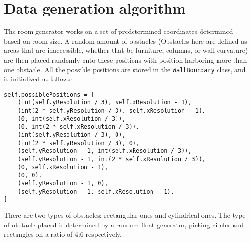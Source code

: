 \section{Data generation algorithm}

The room generator works on a set of predetermined coordinates determined based on room size. A random amount of obstacles (Obstacles here are defined as areas that are inaccessible, whether that be furniture, columns, or wall curvature) are then placed randomly onto these positions with position harboring more than one obstacle. All the possible positions are stored in the \texttt{WallBoundary} class, and is initialized as follows:
\begin{verbatim}
self.possiblePositions = [
    (int(self.yResolution / 3), self.xResolution - 1),
    (int(2 * self.yResolution / 3), self.xResolution - 1),
    (0, int(self.xResolution / 3)),
    (0, int(2 * self.xResolution / 3)),
    (int(self.yResolution / 3), 0),
    (int(2 * self.yResolution / 3), 0),
    (self.yResolution - 1, int(self.xResolution / 3)),
    (self.yResolution - 1, int(2 * self.xResolution / 3)),
    (0, self.xResolution - 1),
    (0, 0),
    (self.yResolution - 1, 0),
    (self.yResolution - 1, self.xResolution - 1),
]
\end{verbatim}

There are two types of obstacles: rectangular ones and cylindrical ones. The type of obstacle placed is determined by a random float generator, picking circles and rectangles on a ratio of 4:6 respectively.

